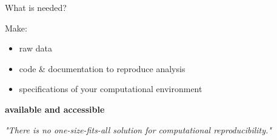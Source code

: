 \documentclass[10pt,aspectratio=169,notes]{beamer} %
\begin{document}
\begin{frame}[label=frame2]{What is needed?}
	\begin{alertblock}{Make:}	
		\begin{itemize}
			\item raw data
			\item code \& documentation to reproduce analysis
			\item specifications of your computational environment
		\end{itemize}
		\textbf{available and accessible}
	\end{alertblock}
	
	\emph{"There is no one-size-fits-all solution for computational reproducibility."}
	\begin{biblio}{}
	\end{biblio}
\end{frame}
\end{document}
